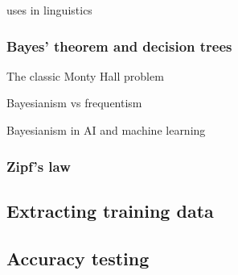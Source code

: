 uses in linguistics



\subsubsection{Bayes' theorem and decision trees} %
\label{ssub:bayestheorem}

The classic Monty Hall problem

Bayesianism vs frequentism

Bayesianism in AI and machine learning



\subsubsection{Zipf's law} %
\label{ssub:zipflaw}


\subsection{Extracting training data} %
\label{sub:extract_training_data}



\subsection{Accuracy testing} %
\label{sub:accuracy-testing}



